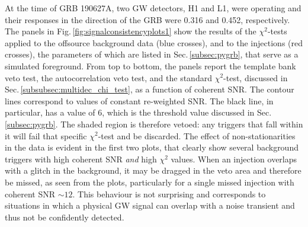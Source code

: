\documentclass[binding=0.6cm, LaM]{sapthesis}
\begin{document}
	At the time of GRB 190627A, two GW detectors, H1 and L1, 
	were operating and their responses in the direction of the GRB were 0.316 and 0.452, respectively.
	The panels in Fig.\,\ref{fig:signalconsistencyplots1} show the results 
	of the $\chi^2$-tests applied to the offsource background data (blue crosses), and to the injections (red crosses),
	the parameters of which are listed in Sec.\,\ref{subsec:pygrb}, that serve as a simulated foreground. 
	From top to bottom, the panels report the template bank veto test, 
	the autocorrelation veto test, and the standard $\chi^2$-test, 
	discussed in Sec.\,\ref{subsubsec:multidec_chi_test}, as a function of coherent SNR. 
	The contour lines correspond to values of constant re-weighted SNR.  
	The black line, in particular, has a value of 6, 
	which is the threshold value discussed in Sec.\,\ref{subsec:pygrb}.
	The shaded region is therefore vetoed: any triggers that fall within it 
	will fail that specific $\chi^2$-test and be discarded.
	The effect of non-stationarities in the data is evident in the first two plots, 
	that clearly show several background triggers with high coherent SNR \emph{and} high $\chi^2$ values.  
	When an injection overlaps with a glitch in the background, 
	it may be dragged in the veto area and therefore be missed, as seen from the plots, 	
	particularly for a single missed injection with coherent SNR $\sim 12$.  
	This behaviour is not surprising and corresponds to situations in which a physical GW signal 
	can overlap with a noise transient and thus not be confidently detected.
\end{document}
